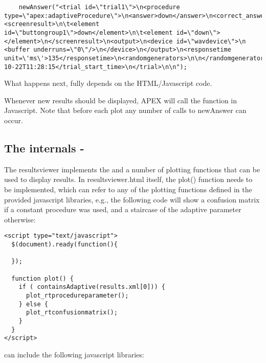 \begin{lstlisting}
	newAnswer("<trial id=\"trial1\">\n<procedure type=\"apex:adaptiveProcedure\">\n<answer>down</answer>\n<correct_answer>up</correct_answer>\n<stimulus>stimulus1</stimulus>\n<correct>false</correct>\n\t<parameter>0</parameter>\n\t<stepsize>2</stepsize>\n\t<reversals>2</reversals>\n\t<saturation>false</saturation>\n\t<presentations>4</presentations>\n</procedure><screenresult>\n\t<element id=\"buttongroup1\">down</element>\n\t<element id=\"down\"></element>\n</screenresult>\n<output>\n<device id=\"wavdevice\">\n  <buffer underruns=\"0\"/>\n</device>\n</output>\n<responsetime unit=\'ms\'>135</responsetime>\n<randomgenerators>\n\n</randomgenerators>\n<trial_start_time>2015-10-22T11:28:15</trial_start_time>\n</trial>\n\n");
\end{lstlisting}

What happens next, fully depends on the HTML/Javascript code.

Whenever new results should be displayed, APEX will call the  function in Javascript. Note that before each plot any number of calls to newAnswer can occur.

\subsection{The internals - }

The resultsviewer implements the  and a number of plotting functions that can be used to display results. In resultsviewer.html itself, the plot() function needs to be implemented, which can refer to any of the plotting functions defined in the provided javascript libraries, e.g., the following code will show a confusion matrix if a constant procedure was used, and a staircase of the adaptive parameter otherwise:

\begin{lstlisting}
<script type="text/javascript">
  $(document).ready(function(){

  });

  function plot() {
    if ( containsAdaptive(results.xml[0])) {
      plot_rtprocedureparameter();
    } else {
      plot_rtconfusionmatrix();
    }
  }
</script>
\end{lstlisting}

 can include the following javascript libraries:

